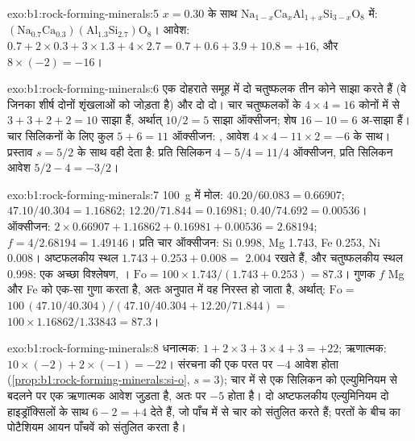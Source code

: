 \begin{solution}{exo:b1:rock-forming-minerals:5}
$x = 0.30$ के साथ $\mathrm{Na}_{1-x}\mathrm{Ca}_x\mathrm{Al}_{1+x}\mathrm{Si}_{3-x}\mathrm{O}_8$ में:
$\mathrm{(Na_{0.7}Ca_{0.3})(Al_{1.3}Si_{2.7})O_8}$। आवेश:
$0.7 + 2\times0.3 + 3\times1.3 + 4\times2.7 = 0.7 + 0.6 + 3.9 + 10.8 = +16$,
और $8\times(-2) = -16$।
\end{solution}

\begin{solution}{exo:b1:rock-forming-minerals:6}
एक दोहराते समूह में दो चतुष्फलक तीन कोने साझा करते हैं (वे जिनका शीर्ष दोनों शृंखलाओं को जोड़ता है) और दो दो। चार
चतुष्फलकों के $4\times4 = 16$ कोनों में से $3 + 3 + 2 + 2 = 10$ साझा हैं, अर्थात्
$10/2 = 5$ साझा ऑक्सीजन; शेष $16 - 10 = 6$ अ-साझा हैं। चार सिलिकनों के लिए कुल
$5 + 6 = 11$ ऑक्सीजन: , आवेश
$4\times4 - 11\times2 = -6$ के साथ। प्रस्ताव $s = 5/2$ के साथ वही देता है: प्रति सिलिकन
$4 - 5/4 = 11/4$ ऑक्सीजन, प्रति सिलिकन आवेश $5/2 - 4 = -3/2$।
\end{solution}

\begin{solution}{exo:b1:rock-forming-minerals:7}
\qty{100}{g} में मोल:  $40.20/60.083 = 0.66907$; 
$47.10/40.304 = 1.16862$;  $12.20/71.844 = 0.16981$; 
$0.40/74.692 = 0.00536$। ऑक्सीजन: $2\times0.66907 + 1.16862 + 0.16981 +
0.00536 = 2.68194$; $f = 4/2.68194 = 1.49146$। प्रति चार ऑक्सीजन: Si
\num{0.998}, Mg \num{1.743}, Fe \num{0.253}, Ni \num{0.008}। अष्टफलकीय स्थल
$1.743 + 0.253 + 0.008 =$ $2.004$ रखते हैं, और चतुष्फलकीय स्थल
\num{0.998}: एक अच्छा विश्लेषण, ।
$\mathrm{Fo} = 100\times1.743/(1.743 + 0.253) = 87.3$। गुणक $f$ Mg और Fe को एक-सा गुणा करता है, अतः अनुपात में
वह निरस्त हो जाता है, अर्थात्:
$\mathrm{Fo} =$ $100\,(47.10/40.304)/(47.10/40.304 + 12.20/71.844) =$
$100\times1.16862/1.33843 = 87.3$।
\end{solution}

\begin{solution}{exo:b1:rock-forming-minerals:8}
धनात्मक: $1 + 2\times3 + 3\times4 + 3 = +22$; ऋणात्मक:
$10\times(-2) + 2\times(-1) = -22$।  संरचना की एक परत पर $-4$ आवेश होता
(\cref{prop:b1:rock-forming-minerals:si-o}, $s = 3$); चार में से एक सिलिकन को एल्युमिनियम से बदलने पर एक ऋणात्मक आवेश
जुड़ता है, अतः  पर $-5$ होता है। दो अष्टफलकीय एल्युमिनियम दो हाइड्रॉक्सिलों के साथ $6 - 2 = +4$ देते
हैं, जो पाँच में से चार को संतुलित करते हैं; परतों के बीच का पोटैशियम आयन पाँचवें को संतुलित करता है।
\end{solution}

